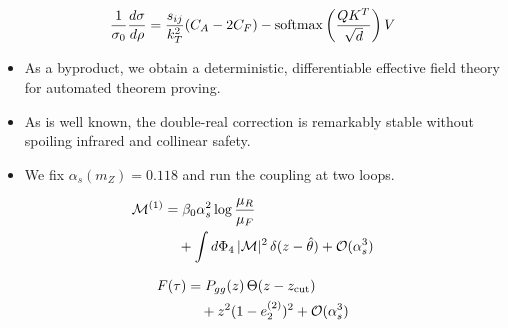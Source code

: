 \begin{equation}
  \frac{1}{\sigma_0} \frac{d\sigma}{d\rho} = \frac{s_{ij}}{k_T^2} (C_A - 2C_F) - \mathrm{softmax}\left(\frac{Q K^T}{\sqrt{d}}\right) V
  \label{eq:2}
\end{equation}

\begin{itemize}
  \item As a byproduct, we obtain a deterministic, differentiable effective field theory for automated theorem proving.
  \item As is well known, the double-real correction is remarkably stable without spoiling infrared and collinear safety.
  \item We fix $\alpha_s(m_Z) = 0.118$ and run the coupling at two loops.
\end{itemize}

\begin{align}
  \mathcal{M}^{(1)} &= \beta_0 \alpha_s^2 \log\frac{\mu_R}{\mu_F} \nonumber \\
  &\quad + \int d\Phi_{4} \, |\mathcal{M}|^2 \, \delta(z - \hat{\theta}) + \mathcal{O}(\alpha_s^3) \label{eq:3}
\end{align}

\begin{align}
  F(\tau) &= P_{gg}(z) \, \Theta(z - z_{\rm cut}) \nonumber \\
  &\quad + {z}^{2} (1 - e_2^{(2)})^{2} + \mathcal{O}(\alpha_s^3) \label{eq:4}
\end{align}

